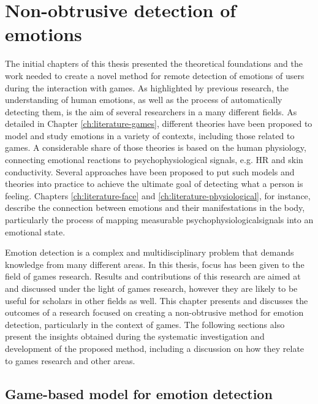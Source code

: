 \chapter{Non-obtrusive detection of emotions}
\label{ch:discussion}

The initial chapters of this thesis presented the theoretical foundations and the work needed to create a novel method for remote detection of emotions of users during the interaction with games. As highlighted by previous research, the understanding of human emotions, as well as the process of automatically detecting them, is the aim of several researchers in a many different fields. As detailed in Chapter \ref{ch:literature-games}, different theories have been proposed to model and study emotions in a variety of contexts, including those related to games. A considerable share of those theories is based on the human physiology, connecting emotional reactions to psychophysiological signals, e.g. HR and skin conductivity. Several approaches have been proposed to put such models and theories into practice to achieve the ultimate goal of detecting what a person is feeling. Chapters \ref{ch:literature-face} and \ref{ch:literature-physiological}, for instance, describe the connection between emotions and their manifestations in the body, particularly the process of mapping measurable psychophysiologicalsignals into an emotional state.

Emotion detection is a complex and multidisciplinary problem that demands knowledge from many different areas. In this thesis, focus has been given to the field of games research. Results and contributions of this research are aimed at and discussed under the light of games research, however they are likely to be useful for scholars in other fields as well. This chapter presents and discusses the outcomes of a research focused on creating a non-obtrusive method for emotion detection, particularly in the context of games. The following sections also present the insights obtained during the systematic investigation and development of the proposed method, including a discussion on how they relate to games research and other areas.

\section{Game-based model for emotion detection}

